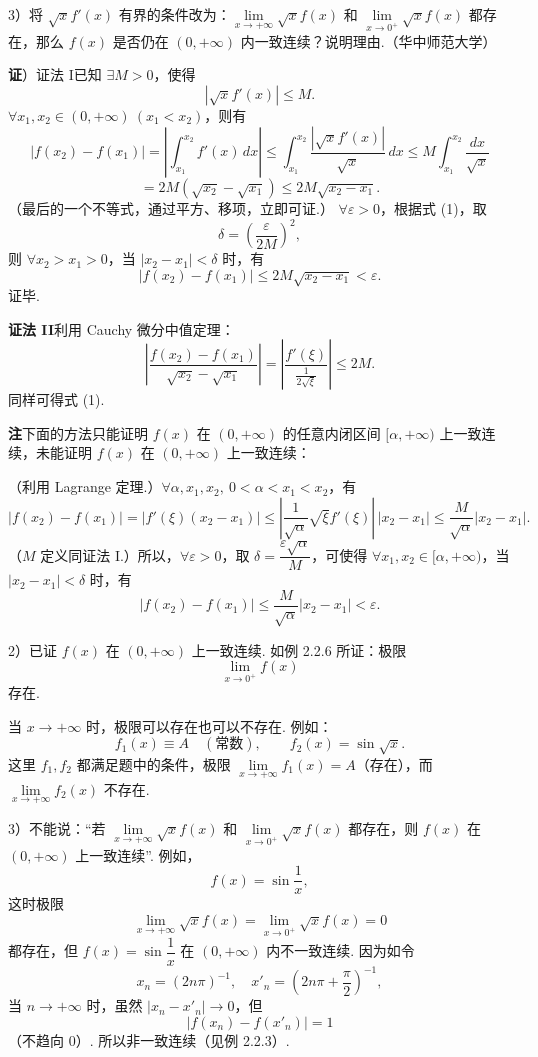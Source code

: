 \documentclass[UTF8,12pt,a4paper,fontset=fandol]{ctexart}
\begin{document}
3）将 $\sqrt{x}f'(x)$ 有界的条件改为：$\lim\limits_{x\to+\infty}\sqrt{x}f(x)$ 和
$\lim\limits_{x\to0^+}\sqrt{x}f(x)$ 都存在，那么 $f(x)$ 是否仍在 $(0,+\infty)$ 内一致连续？说明理由.（华中师范大学）

\noindent\textbf{证}）证法 I\quad 已知 $\exists M>0$，使得
\[
|\sqrt{x}f'(x)|\le M.
\]
$\forall x_1,x_2\in(0,+\infty)\ (x_1<x_2)$，则有
\[
|f(x_2)-f(x_1)|=\left|\int_{x_1}^{x_2}f'(x)\,dx\right|
\le\int_{x_1}^{x_2}\frac{|\sqrt{x}f'(x)|}{\sqrt{x}}\,dx
\le M\int_{x_1}^{x_2}\frac{dx}{\sqrt{x}}
\]
\[
=2M(\sqrt{x_2}-\sqrt{x_1})\le2M\sqrt{x_2-x_1}. \tag{1}
\]
（最后的一个不等式，通过平方、移项，立即可证.）
$\forall\varepsilon>0$，根据式 (1)，取
\[
\delta=\left(\frac{\varepsilon}{2M}\right)^2,
\]
则 $\forall x_2>x_1>0$，当 $|x_2-x_1|<\delta$ 时，有
\[
|f(x_2)-f(x_1)|\le2M\sqrt{x_2-x_1}<\varepsilon.
\]
证毕.

\noindent\textbf{证法 II}\quad 利用 Cauchy 微分中值定理：
\[
\left|\frac{f(x_2)-f(x_1)}{\sqrt{x_2}-\sqrt{x_1}}\right|
=\left|\frac{f'(\xi)}{\frac1{2\sqrt{\xi}}}\right|\le2M.
\]
同样可得式 (1).

\noindent\textbf{注}\quad 下面的方法只能证明 $f(x)$ 在 $(0,+\infty)$ 的任意内闭区间
$[\alpha,+\infty)$ 上一致连续，未能证明 $f(x)$ 在 $(0,+\infty)$ 上一致连续：

（利用 Lagrange 定理.）$\forall\alpha,x_1,x_2,\ 0<\alpha<x_1<x_2$，有
\[
|f(x_2)-f(x_1)|
=|f'(\xi)(x_2-x_1)|
\le\left|\frac1{\sqrt{\alpha}}\sqrt{\xi}f'(\xi)\right|\,|x_2-x_1|
\le\frac M{\sqrt{\alpha}}|x_2-x_1|.
\]
（$M$ 定义同证法 I.）所以，$\forall\varepsilon>0$，取
$\delta=\dfrac{\varepsilon\sqrt{\alpha}}M$，可使得 $\forall x_1,x_2\in[\alpha,+\infty)$，当
$|x_2-x_1|<\delta$ 时，有
\[
|f(x_2)-f(x_1)|\le\frac M{\sqrt{\alpha}}|x_2-x_1|<\varepsilon.
\]

2）已证 $f(x)$ 在 $(0,+\infty)$ 上一致连续. 如例 2.2.6 所证：极限
\[
\lim_{x\to0^+}f(x)
\]
存在.

当 $x\to+\infty$ 时，极限可以存在也可以不存在. 例如：
\[
f_1(x)\equiv A\quad(\text{常数}),\qquad f_2(x)=\sin\sqrt{x}.
\]
这里 $f_1,f_2$ 都满足题中的条件，极限 $\lim\limits_{x\to+\infty}f_1(x)=A$（存在），而
$\lim\limits_{x\to+\infty}f_2(x)$ 不存在.

3）不能说：“若 $\lim\limits_{x\to+\infty}\sqrt{x}f(x)$ 和
$\lim\limits_{x\to0^+}\sqrt{x}f(x)$ 都存在，则 $f(x)$ 在 $(0,+\infty)$ 上一致连续”. 例如，
\[
f(x)=\sin\frac1x,
\]
这时极限
\[
\lim_{x\to+\infty}\sqrt{x}f(x)=\lim_{x\to0^+}\sqrt{x}f(x)=0
\]
都存在，但 $f(x)=\sin\dfrac1x$ 在 $(0,+\infty)$ 内不一致连续. 因为如令
\[
x_n=(2n\pi)^{-1},\quad x'_n=\left(2n\pi+\frac\pi2\right)^{-1},
\]
当 $n\to+\infty$ 时，虽然 $|x_n-x'_n|\to0$，但
\[
|f(x_n)-f(x'_n)|=1
\]
（不趋向 0）. 所以非一致连续（见例 2.2.3）.
\end{document}
